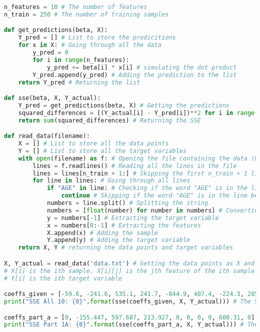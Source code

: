 \documentclass[15pt,a4paper,openright]{article}
\begin{document}
\begin{lstlisting}[language=Python, caption=1e Code]
n_features = 10 # The number of features
n_train = 250 # The number of training samples

def get_predictions(beta, X):
	Y_pred = [] # List to store the predicitions
	for x in X: # Going through all the data
		y_pred = 0
		for i in range(n_features):
			y_pred += beta[i] * x[i] # simulating the dot product
		Y_pred.append(y_pred) # Adding the prediction to the list
	return Y_pred # Returning the list

def sse(beta, X, Y_actual):
	Y_pred = get_predictions(beta, X) # Getting the predictions
	squared_differences = [(Y_actual[i] - Y_pred[i])**2 for i in range(len(Y_pred))] # Calculating the sum of squared errors
	return sum(squared_differences) # Returning the SSE

def read_data(filename):
	X = [] # List to store all the data points
	Y = [] # List to store all the target variables
	with open(filename) as f: # Opening the file containing the data (NOT necessarily .dat)
		lines = f.readlines() # Reading all the lines in the file
		lines = lines[n_train + 1:] # Skipping the first n_train + 1 lines since we need out-of-sample error and the first line is just feature names
		for line in lines: # Going through all lines
			if "AGE" in line: # Checking if the word "AGE" is in the line 
				continue # Skipping if the word "AGE" is in the line because if it is, the line is just feature names, not an actual sample
			numbers = line.split() # Splitting the string
			numbers = [float(number) for number in numbers] # Converting strings to numbers
			y = numbers[-1] # Extracting the target variable
			x = numbers[0:-1] # Extracting the features
			X.append(x) # Adding the sample
			Y.append(y) # Adding the target variable
	return X, Y # returning the data points and target variables

X, Y_actual = read_data('data.txt') # Getting the data points as X and target variables as Y
# X[i] is the ith sample. X[i][j] is the jth feature of the ith sample
# Y[i] is the ith target variable

coeffs_given = [-59.6, -241.6, 535.1, 241.7, -844.9, 407.4, -224.3, 285.2, 762.4, 169.6] # The coefficients given to us
print("SSE All 10: {0}".format(sse(coeffs_given, X, Y_actual))) # The SSE using  the coefficients given

coeffs_part_a = [0, -155.447, 597.687, 213.927, 0, 0, 0, 0, 600.31, 0] # The coefficients from part (a)
print("SSE Part 1A: {0}".format(sse(coeffs_part_a, X, Y_actual))) # The SSE using  the coefficients from part (a)


\end{lstlisting}
\end{document}
